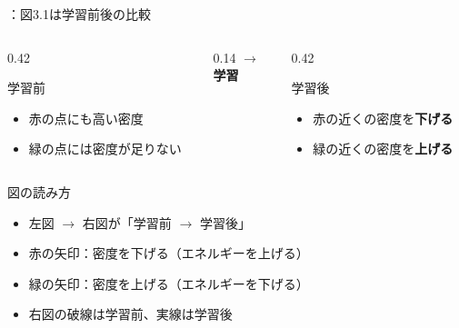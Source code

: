 \assuppl
\begin{frame}{\supplmark：図3.1は学習前後の比較}
    \begin{columns}[c,onlytextwidth]
        \begin{column}{0.42\textwidth}
            \begin{exampleblock}{学習前}
                \begin{itemize}
                    \item 赤の点にも高い密度
                    \item 緑の点には密度が足りない
                \end{itemize}
            \end{exampleblock}
        \end{column}
        \begin{column}{0.14\textwidth}
            \centering
            {\Large\textcolor{examplecol}{$\longrightarrow$}}\\[0.3em]
            {\footnotesize\bfseries 学習}
        \end{column}
        \begin{column}{0.42\textwidth}
            \begin{exampleblock}{学習後}
                \begin{itemize}
                    \item 赤の近くの密度を\textcolor{alertcol}{\textbf{下げる}}
                    \item 緑の近くの密度を\textcolor{examplecol}{\textbf{上げる}}
                \end{itemize}
            \end{exampleblock}
        \end{column}
    \end{columns}
    \vspace{0.7em}
    \begin{exampleblock}{図の読み方}
        \begin{itemize}
            \item 左図 $\to$ 右図が「学習前 $\to$ 学習後」
            \item 赤の矢印：密度を下げる（エネルギーを上げる）
            \item 緑の矢印：密度を上げる（エネルギーを下げる）
            \item 右図の破線は学習前、実線は学習後
        \end{itemize}
    \end{exampleblock}
\end{frame}
